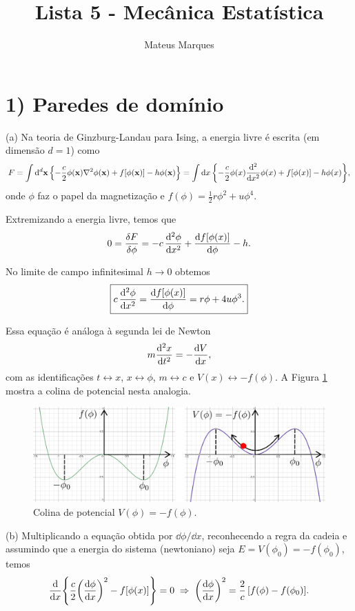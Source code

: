\documentclass[a4paper,10pt]{article}
\title{\Huge{\textbf{Lista 5 - Mecânica Estatística}}}
\author{Mateus Marques}
\begin{document}
\maketitle

\section*{1) Paredes de domínio}

(a) Na teoria de Ginzburg-Landau para Ising, a energia livre é escrita (em dimensão $d=1$) como
$$
F = \int \dd[d]{\vb{x}} \qty{-\frac{c}{2} \phi(\vb{x}) \nabla^2 \phi(\vb{x}) + f[\phi(\vb{x})] - h \phi(\vb{x})} = \int \dd{x} \qty{-\frac{c}{2} \phi(x) \dv[2]{x} \phi(x) + f[\phi(x)] - h \phi(x)},
$$
onde $\phi$ faz o papel da magnetização e $f(\phi) = \frac{1}{2} r \phi^2 + u \phi^4$.

\n

Extremizando a energia livre, temos que
$$
0 = \fdv{F}{\phi} = -c \, \dv[2]{\phi}{x} + \dv{f[\phi(x)]}{\phi} - h.
$$

No limite de campo infinitesimal $h \to 0$ obtemos
$$
\boxed{ c \, \dv[2]{\phi}{x} = \dv{f[\phi(x)]}{\phi} = r \phi + 4u \phi^3. }
$$

Essa equação é análoga à segunda lei de Newton
$$
m \dv[2]{x}{t} = - \dv{V}{x},
$$
com as identificações $t \leftrightarrow x$, $x \leftrightarrow \phi$, $m \leftrightarrow c$ e $V(x) \leftrightarrow -f(\phi)$. A Figura \ref{fig:hill} mostra a colina de potencial nesta analogia.
\begin{figure}[H]
\centering
\includegraphics[width=0.9\linewidth]{fig/hill.png}
\caption{Colina de potencial $V(\phi) = -f(\phi)$.}
\label{fig:hill}
\end{figure}

\n\n

(b) Multiplicando a equação obtida por $\dd{\phi}/\dd{x}$, reconhecendo a regra da cadeia e assumindo que a energia do sistema (newtoniano) seja $E = V(\phi_0) = -f(\phi_0)$, temos
$$
\dv{x}\qty{\frac{c}{2} \qty(\dv{\phi}{x})^2 - f[\phi(x)]} = 0 \; \Rightarrow \;
\qty(\dv{\phi}{x})^2 = \frac{2}{c} \, [f(\phi) - f(\phi_0)].
$$
\end{document}
